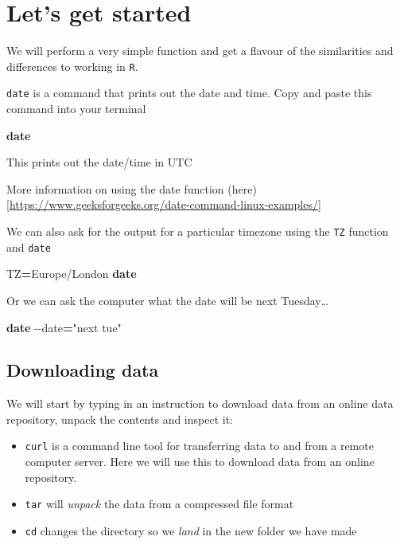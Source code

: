 \documentclass[
]{book}
\newenvironment{Shaded}{\begin{snugshade}}{\end{snugshade}}
\newcommand{\AttributeTok}[1]{\textcolor[rgb]{0.13,0.29,0.53}{#1}}
\newcommand{\FunctionTok}[1]{\textcolor[rgb]{0.13,0.29,0.53}{\textbf{#1}}}
\newcommand{\NormalTok}[1]{#1}
\newcommand{\OperatorTok}[1]{\textcolor[rgb]{0.81,0.36,0.00}{\textbf{#1}}}
\newcommand{\StringTok}[1]{\textcolor[rgb]{0.31,0.60,0.02}{#1}}
\newcommand{\VariableTok}[1]{\textcolor[rgb]{0.00,0.00,0.00}{#1}}
\begin{document}
\hypertarget{lets-get-started}{%
\section{Let's get started}\label{lets-get-started}}

We will perform a very simple function and get a flavour of the similarities and differences to working in \texttt{R}.

\texttt{date} is a command that prints out the date and time. Copy and paste this command into your terminal

\begin{Shaded}
\begin{Highlighting}[]
    \FunctionTok{date}
\end{Highlighting}
\end{Shaded}

This prints out the date/time in UTC

More information on using the date function (here){[}\url{https://www.geeksforgeeks.org/date-command-linux-examples/}{]}

We can also ask for the output for a particular timezone using the \texttt{TZ} function and \texttt{date}

\begin{Shaded}
\begin{Highlighting}[]
    \VariableTok{TZ}\OperatorTok{=}\NormalTok{Europe/London }\FunctionTok{date}
\end{Highlighting}
\end{Shaded}

Or we can ask the computer what the date will be next Tuesday\ldots{}

\begin{Shaded}
\begin{Highlighting}[]
    \FunctionTok{date} \AttributeTok{{-}{-}date}\OperatorTok{=}\StringTok{"next tue"}
\end{Highlighting}
\end{Shaded}

\hypertarget{downloading-data}{%
\subsection{Downloading data}\label{downloading-data}}

We will start by typing in an instruction to download data from an online data repository, unpack the contents and inspect it:

\begin{itemize}
\item
  \texttt{curl} is a command line tool for transferring data to and from a remote computer server. Here we will use this to download data from an online repository.
\item
  \texttt{tar} will \emph{unpack} the data from a compressed file format
\item
  \texttt{cd} changes the directory so we \emph{land} in the new folder we have made
\end{itemize}
\end{document}
